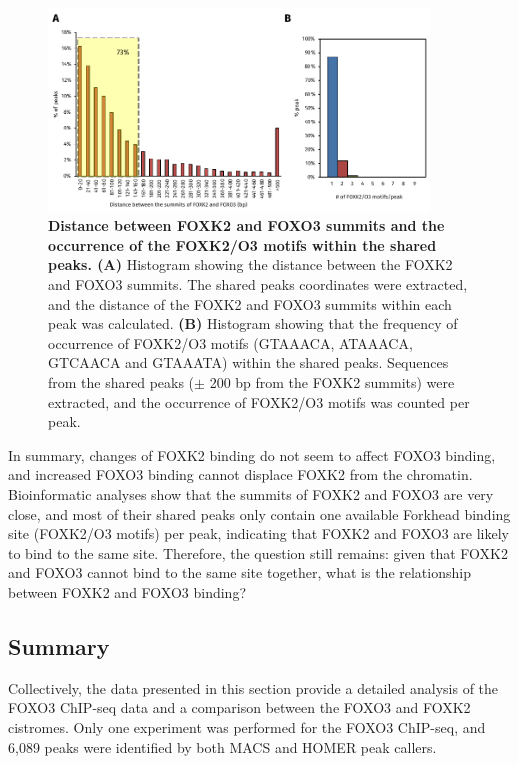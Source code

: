 \begin{figure}[!h]
    \centering
    \includegraphics[width=0.9\textwidth]{chapter3/figures_foxo3/fig51.pdf}
    \caption[Distance between FOXK2 and FOXO3 summits and the occurrence of the FOXK2/O3 motifs within the shared peaks]{\textbf{Distance between FOXK2 and FOXO3 summits and the occurrence of the FOXK2/O3 motifs within the shared peaks. (A)} Histogram showing the distance between the FOXK2 and FOXO3 summits. The shared peaks coordinates were extracted, and the distance of the FOXK2 and FOXO3 summits within each peak was calculated. \textbf{(B)} Histogram showing that the frequency of occurrence of FOXK2/O3 motifs (GTAAACA, ATAAACA, GTCAACA and GTAAATA) within the shared peaks. Sequences from the shared peaks ($\pm$ 200 bp from the FOXK2 summits) were extracted, and the occurrence of FOXK2/O3 motifs was counted per peak.}
    \label{fig:fig51}
\end{figure}

In summary, changes of FOXK2 binding do not seem to affect FOXO3 binding, and increased FOXO3 binding cannot displace FOXK2 from the chromatin. Bioinformatic analyses show that the summits of FOXK2 and FOXO3 are very close, and most of their shared peaks only contain one available Forkhead binding site (FOXK2/O3 motifs) per peak, indicating that FOXK2 and FOXO3 are likely to bind to the same site. Therefore, the question still remains: given that FOXK2 and FOXO3 cannot bind to the same site together, what is the relationship between FOXK2 and FOXO3 binding?

\subsection{Summary}

Collectively, the data presented in this section provide a detailed analysis of the FOXO3 ChIP-seq data and a comparison between the FOXO3 and FOXK2 cistromes. Only one experiment was performed for the FOXO3 ChIP-seq, and 6,089 peaks were identified by both MACS and HOMER peak callers.

